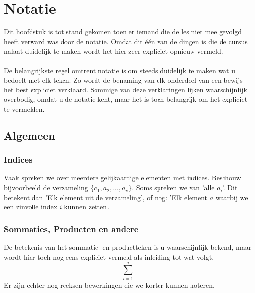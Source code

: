 \documentclass[lineaire_algebra_oplossingen.tex]{subfiles}
\begin{document}
\chapter{Notatie}
Dit hoofdstuk is tot stand gekomen toen er iemand die de les niet mee gevolgd heeft verward was door de notatie.
Omdat dit \'e\'en van de dingen is die de cursus nalaat duidelijk te maken wordt het hier zeer expliciet opnieuw vermeld.\\\\
De belangrijkste regel omtrent notatie is om steeds duidelijk te maken wat u bedoelt met elk teken.
Zo wordt de benaming van elk onderdeel van een bewijs het best expliciet verklaard.
Sommige van deze verklaringen lijken waarschijnlijk overbodig, omdat u de notatie kent, maar het is toch belangrijk om het expliciet te vermelden.

\section{Algemeen}
\subsection{Indices}
Vaak spreken we over meerdere gelijkaardige elementen met indices. Beschouw bijvoorbeeld de verzameling $\{a_1,a_2,...,a_n\}$.
Soms spreken we van 'alle $a_i$'.
Dit betekent dan 'Elk element uit de verzameling', of nog: 'Elk element $a$ waarbij we een zinvolle index $i$ kunnen zetten'.
 
\subsection{Sommaties, Producten en andere}
De betekenis van het sommatie- en productteken is u waarschijnlijk bekend, maar wordt hier toch nog eens expliciet vermeld als inleiding tot wat volgt. 
\[
\sum_{i=1}^n
\]
Er zijn echter nog reeksen bewerkingen die we korter kunnen noteren. 
\end{document}
